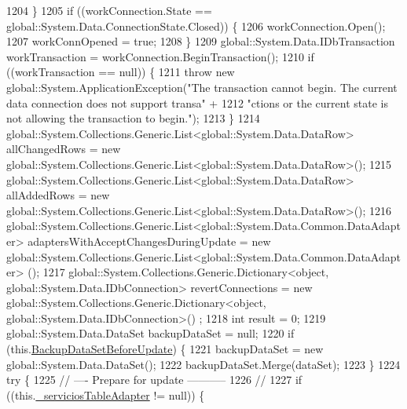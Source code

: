 \begin{DoxyCode}
1204             \}
1205             \textcolor{keywordflow}{if} ((workConnection.State == global::System.Data.ConnectionState.Closed)) \{
1206                 workConnection.Open();
1207                 workConnOpened = \textcolor{keyword}{true};
1208             \}
1209             global::System.Data.IDbTransaction workTransaction = workConnection.BeginTransaction();
1210             \textcolor{keywordflow}{if} ((workTransaction == null)) \{
1211                 \textcolor{keywordflow}{throw} \textcolor{keyword}{new} global::System.ApplicationException(\textcolor{stringliteral}{"The transaction cannot begin. The current
       data connection does not support transa"} +
1212                         \textcolor{stringliteral}{"ctions or the current state is not allowing the transaction to begin."});
1213             \}
1214             global::System.Collections.Generic.List<global::System.Data.DataRow> allChangedRows = \textcolor{keyword}{new} 
      global::System.Collections.Generic.List<global::System.Data.DataRow>();
1215             global::System.Collections.Generic.List<global::System.Data.DataRow> allAddedRows = \textcolor{keyword}{new} 
      global::System.Collections.Generic.List<global::System.Data.DataRow>();
1216             global::System.Collections.Generic.List<global::System.Data.Common.DataAdapter> 
      adaptersWithAcceptChangesDuringUpdate = \textcolor{keyword}{new} global::System.Collections.Generic.List<global::System.Data.Common.DataAdapter>
      ();
1217             global::System.Collections.Generic.Dictionary<object, global::System.Data.IDbConnection> 
      revertConnections = \textcolor{keyword}{new} global::System.Collections.Generic.Dictionary<object, global::System.Data.IDbConnection>()
      ;
1218             \textcolor{keywordtype}{int} result = 0;
1219             global::System.Data.DataSet backupDataSet = null;
1220             \textcolor{keywordflow}{if} (this.\hyperlink{class_proyecto___integrador__3_1_1ds_servicios_table_adapters_1_1_table_adapter_manager_a746392e04b3bd5203f1e2ed6ab33595c}{BackupDataSetBeforeUpdate}) \{
1221                 backupDataSet = \textcolor{keyword}{new} global::System.Data.DataSet();
1222                 backupDataSet.Merge(dataSet);
1223             \}
1224             \textcolor{keywordflow}{try} \{
1225                 \textcolor{comment}{// ---- Prepare for update -----------}
1226                 \textcolor{comment}{//}
1227                 \textcolor{keywordflow}{if} ((this.\hyperlink{class_proyecto___integrador__3_1_1ds_servicios_table_adapters_1_1_table_adapter_manager_ac26b431a74f60f4ba1f8cc57cb5e75e2}{\_serviciosTableAdapter} != null)) \{

\end{DoxyCode}
